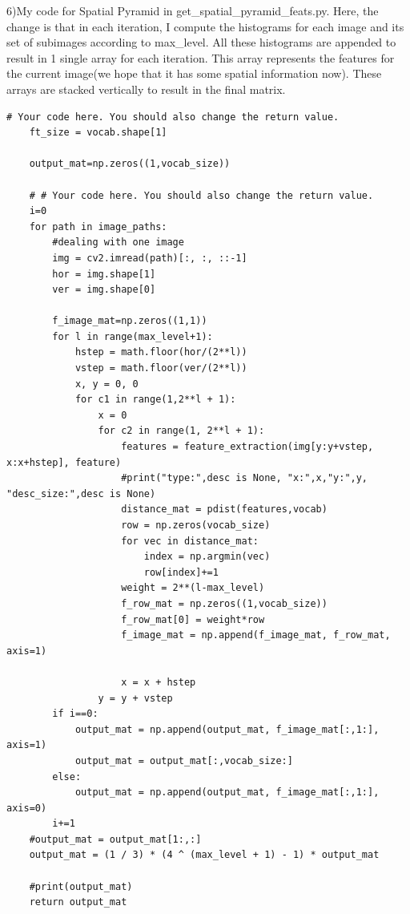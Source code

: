 6)My code for Spatial Pyramid in get\_spatial\_pyramid\_feats.py. Here, the change is that in each iteration, I compute the histograms for each image and its set of subimages according to max\_level. All these histograms are appended to result in 1 single array for each iteration. This array represents the features for the current image(we hope that it has some spatial information now). These arrays are stacked vertically to result in the final matrix.
\begin{lstlisting}[style=Matlab-editor]
    # Your code here. You should also change the return value.
    ft_size = vocab.shape[1]

    output_mat=np.zeros((1,vocab_size))

    # # Your code here. You should also change the return value.
    i=0
    for path in image_paths:
        #dealing with one image
        img = cv2.imread(path)[:, :, ::-1]
        hor = img.shape[1]
        ver = img.shape[0]
        
        f_image_mat=np.zeros((1,1))
        for l in range(max_level+1):
            hstep = math.floor(hor/(2**l))
            vstep = math.floor(ver/(2**l))
            x, y = 0, 0
            for c1 in range(1,2**l + 1):
                x = 0
                for c2 in range(1, 2**l + 1):                
                    features = feature_extraction(img[y:y+vstep, x:x+hstep], feature)                
                    #print("type:",desc is None, "x:",x,"y:",y, "desc_size:",desc is None)
                    distance_mat = pdist(features,vocab)
                    row = np.zeros(vocab_size)
                    for vec in distance_mat:
                        index = np.argmin(vec)
                        row[index]+=1
                    weight = 2**(l-max_level)
                    f_row_mat = np.zeros((1,vocab_size))
                    f_row_mat[0] = weight*row
                    f_image_mat = np.append(f_image_mat, f_row_mat, axis=1)

                    x = x + hstep
                y = y + vstep
        if i==0:
            output_mat = np.append(output_mat, f_image_mat[:,1:], axis=1)
            output_mat = output_mat[:,vocab_size:]
        else:
            output_mat = np.append(output_mat, f_image_mat[:,1:], axis=0)
        i+=1
    #output_mat = output_mat[1:,:]
    output_mat = (1 / 3) * (4 ^ (max_level + 1) - 1) * output_mat

    #print(output_mat)
    return output_mat
\end{lstlisting}

